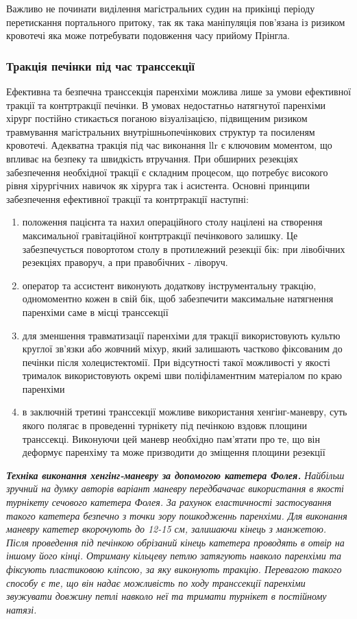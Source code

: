 \begin{refsection}
Важливо не починати виділення магістральних судин на прикінці періоду перетискання портального притоку, так як така маніпуляція пов'язана із ризиком кровотечі яка може потребувати подовження часу прийому Прінгла. 

\subsubsection{Тракція печінки під час транссекції}

Ефективна та безпечна транссекція паренхіми можлива лише за умови ефективної тракції та контртракції печінки. В умовах недостатньо натягнутої паренхіми хірург постійно стикається поганою візуалізацією, підвищеним ризиком травмування магістральних внутрішньопечінкових структур та посиленям кровотечі. Адекватна тракція під час виконання \acrshort{llr} є ключовим моментом, що впливає на безпеку та швидкість втручання. При обширних резекціях забезпечення необхідної тракції є складним процесом, що потребує високого рівня хірургічних навичок як хірурга так і асистента. Основні принципи забезпечення ефективної тракції та контртракції наступні:
\begin{enumerate}
    \item положення пацієнта та нахил операційного столу націлені на створення максимальної гравітаційної контртракції печінкового залишку. Це забезпечується повортотом столу в протилежний резекції бік: при лівобічних резекціях праворуч, а при правобічних - ліворуч.
    \item оператор та ассистент виконують додаткову інструментальну тракцію, одномоментно кожен в свій бік, щоб забезпечити максимальне натягнення паренхіми саме в місці транссекції
    \item для зменшення травматизації паренхіми для тракції використовують культю круглої зв'язки або жовчний міхур, який залишають частково фіксованим до печінки після холецистектомії. При відсутності такої можливості у якості трималок використовують окремі шви поліфіламентним матеріалом по краю паренхіми
    \item в заключній третині транссекції можливе використання хенгінг-маневру, суть якого полягає в проведенні турнікету під печінкою вздовж площини транссекці. Виконуючи цей маневр необхідно пам'ятати про те, що він деформує паренхіму та може призводити до зміщення площини резекції
\end{enumerate}

\textit{ \textbf{Техніка виконання хенгінг-маневру за допомогою катетера Фолея.} Найбільш зручний на думку авторів варіант маневру передбачачає використання в якості турнікету сечового катетера Фолея. За рахунок еластичності застосування такого катетера безпечно з точки зору пошкодженнь паренхіми. Для виконання маневру катетер вкорочують до 12-15 см, залишаючи кінець з манжетою. Після проведення під печінкою обрізаний кінець катетера проводять в отвір на іншому його кінці. Отриману кільцеву петлю затягують навколо паренхіми та фіксують пластиковою кліпсою, за яку виконують тракцію. Перевагою такого способу є те, що він надає можливість по ходу транссекції паренхіми звужувати довжину петлі навколо неї та тримати турнікет в постійному натязі.}


\end{refsection}
